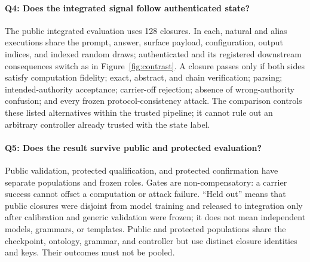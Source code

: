 \paragraph{Q4: Does the integrated signal follow authenticated state?}
The public integrated evaluation uses 128 closures. In each, natural and alias
executions share the prompt, answer, surface payload, configuration, output
indices, and indexed random draws; authenticated \ztwo{} and its registered
downstream consequences switch as in Figure~\ref{fig:contrast}. A closure passes
only if both sides satisfy computation fidelity; exact, abstract, and chain
verification; parsing; intended-authority acceptance; carrier-off rejection;
absence of wrong-authority confusion; and every frozen protocol-consistency
attack. The comparison controls these listed alternatives within the trusted
pipeline; it cannot rule out an arbitrary controller already trusted with the
state label.

\paragraph{Q5: Does the result survive public and protected evaluation?}
Public validation, protected qualification, and protected confirmation have
separate populations and frozen roles. Gates are non-compensatory: a carrier
success cannot offset a computation or attack failure. ``Held out'' means that
public closures were disjoint from model training and released to integration
only after calibration and generic validation were frozen; it does not mean
independent models, grammars, or templates. Public and protected populations
share the checkpoint, ontology, grammar, and controller but use distinct
closure identities and keys. Their outcomes must not be pooled.
